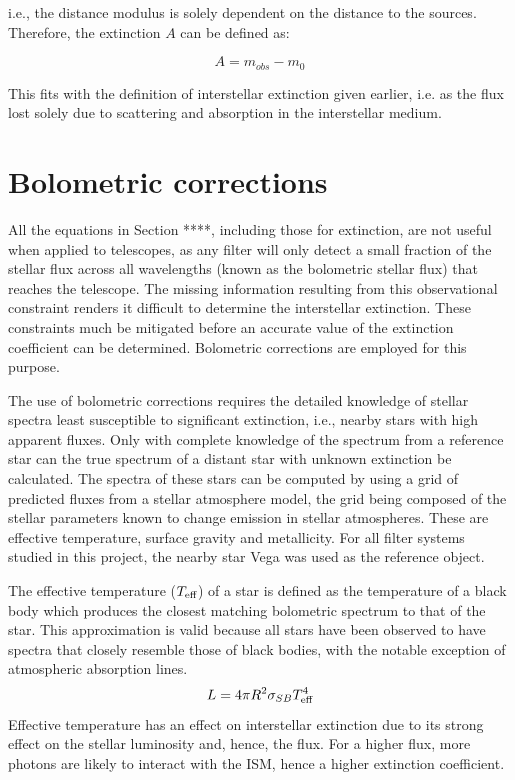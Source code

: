 \documentclass[a4paper, 11pt, oneside]{LJMU_Astro_Thesis}  %
\begin{document}
i.e., the distance modulus is solely dependent on the distance to the  sources. Therefore, the extinction $A$ can be defined as:

\begin{equation}
\label{intrinsic_app_mag}
A = m_{obs} - m_{0}
\end{equation}

This fits with the definition of interstellar extinction given earlier, i.e. as the flux lost solely due to scattering and absorption in the interstellar medium.

\section{Bolometric corrections}
All the equations in Section ****, including those for extinction, are not useful when applied to telescopes, as any filter will only detect a small fraction of the stellar flux across all wavelengths (known as the bolometric stellar flux) that reaches the telescope. The missing information resulting from this observational constraint renders it difficult to determine the interstellar extinction. These constraints much be mitigated before an accurate value of the extinction coefficient can be determined. Bolometric corrections are employed for this purpose.

The use of bolometric corrections requires the detailed knowledge of stellar spectra least susceptible to significant extinction, i.e., nearby stars with high apparent fluxes. Only with complete knowledge of the spectrum from a reference star can the true spectrum of a distant star with unknown extinction be calculated. The spectra of these stars can be computed by using a grid of predicted fluxes from a stellar atmosphere model, the grid being composed of the stellar parameters known to change emission in stellar atmospheres. These are effective temperature, surface gravity and metallicity. For all filter systems studied in this project, the nearby star Vega was used as the reference object.

The effective temperature ($T_{\textnormal{eff}}$) of a star is defined as the temperature of a black body which produces the closest matching bolometric spectrum to that of the star. This approximation is valid because all stars have been observed to have spectra that closely resemble those of black bodies, with the notable exception of atmospheric absorption lines.
\begin{equation}
L = 4 \pi R^{2} \sigma_{SB} T_{\textnormal{eff}}^{4}
\label{Teff_def}
\end{equation}
Effective temperature has an effect on interstellar extinction due to its strong effect on the stellar luminosity and, hence, the flux. For a higher flux, more photons are likely to interact with the ISM, hence a higher extinction coefficient.
\end{document}
